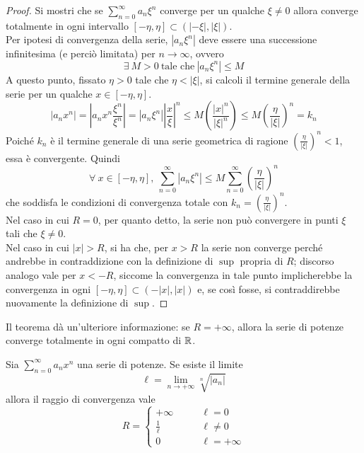 \begin{proof}
 Si mostri che se $\sum\limits_{n=0}^{\infty}{a_n \xi^n}$ converge per un qualche $\xi \neq 0$ allora converge totalmente in ogni intervallo $[-\eta, \eta] \subset (|-\xi|, |\xi|)$.\\
 Per ipotesi di convergenza della serie, $|a_n \xi^n|$ deve essere una successione infinitesima (e perciò limitata) per $n\to \infty$, ovvero
 \begin{equation}
     \exists\ M>0\ \text{tale che}\ |a_n\xi^n|\leq M
 \end{equation}
 A questo punto, fissato $\eta>0$ tale che $\eta<|\xi|$, si calcoli il termine generale della serie per un qualche $x \in [-\eta, \eta]$.
 \begin{equation}
     |a_n x^n| = \left|a_n x^n \frac{\xi^n}{\xi^n}\right|=\left|a_n \xi^n\right| \left|\frac{x}{\xi}\right|^n \leq M \left(\frac{|x|^n}{\left|\xi\right|^n} \right)\leq M \left(\frac{\eta}{\left| \xi \right|} \right)^n =k_n
 \end{equation}
 Poiché $k_n$ è il termine generale di una serie geometrica di ragione $\left(\tfrac{\eta}{\left| \xi \right|} \right)^n < 1$, essa è convergente. Quindi
 \begin{equation}
 \forall\ x \in [-\eta, \eta],\ \sum\limits_{n=0}^{\infty}{|a_n \xi^n|} \leq M \sum_{n=0}^{\infty}{\left(\frac{\eta}{\left| \xi \right|} \right)^n}
 \end{equation}
 che soddisfa le condizioni di convergenza totale con $k_n=\left(\tfrac{\eta}{\left| \xi \right|} \right)^n$.\\
 Nel caso in cui $R=0$, per quanto detto, la serie non può convergere in punti $\xi$ tali che $\xi \neq 0$.\\
 Nel caso in cui $|x|>R$, si ha che, per $x>R$ la serie non converge perché andrebbe in contraddizione con la definizione di $\sup$ propria di $R$; discorso analogo vale per $x<-R$, siccome la convergenza in tale punto implicherebbe la convergenza in ogni $[-\eta, \eta] \subset (-|x|, |x|)$ e, se così fosse, si contraddirebbe nuovamente la definizione di $\sup$.
\end{proof}
\begin{oss}
Il teorema dà un'ulteriore informazione: se $R= +\infty$, allora la serie di potenze converge totalmente in ogni compatto di $\mathbb{R}$.
\end{oss}
\begin{theorem} \label{Teo: Criterio di Cauchy-Hadamard}
Sia $\sum\limits_{n=0}^{\infty}{a_n x^n}$ una serie di potenze. Se esiste il limite
\begin{equation}
    \ell=\lim_{n \to +\infty}{\sqrt[n]{|a_n|}}
\end{equation}
    allora il raggio di convergenza vale
    \begin{equation}
        R = \begin{cases}
            +\infty &\qquad \ell=0\\
            \frac{1}{\ell} &\qquad \ell \neq 0\\
            0 &\qquad \ell = +\infty
        \end{cases}
    \end{equation}
\end{theorem}
